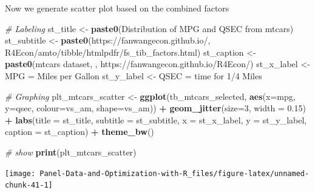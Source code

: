 \documentclass[
]{book}
\newenvironment{Shaded}{\begin{snugshade}}{\end{snugshade}}
\newcommand{\CommentTok}[1]{\textcolor[rgb]{0.56,0.35,0.01}{\textit{#1}}}
\newcommand{\DataTypeTok}[1]{\textcolor[rgb]{0.13,0.29,0.53}{#1}}
\newcommand{\DecValTok}[1]{\textcolor[rgb]{0.00,0.00,0.81}{#1}}
\newcommand{\FloatTok}[1]{\textcolor[rgb]{0.00,0.00,0.81}{#1}}
\newcommand{\KeywordTok}[1]{\textcolor[rgb]{0.13,0.29,0.53}{\textbf{#1}}}
\newcommand{\NormalTok}[1]{#1}
\newcommand{\OperatorTok}[1]{\textcolor[rgb]{0.81,0.36,0.00}{\textbf{#1}}}
\newcommand{\StringTok}[1]{\textcolor[rgb]{0.31,0.60,0.02}{#1}}
\begin{document}
Now we generate scatter plot based on the combined factors

\begin{Shaded}
\begin{Highlighting}[]
\CommentTok{\# Labeling}
\NormalTok{st\_title \textless{}{-}}\StringTok{ }\KeywordTok{paste0}\NormalTok{(}\StringTok{\textquotesingle{}Distribution of MPG and QSEC from mtcars\textquotesingle{}}\NormalTok{)}
\NormalTok{st\_subtitle \textless{}{-}}\StringTok{ }\KeywordTok{paste0}\NormalTok{(}\StringTok{\textquotesingle{}https://fanwangecon.github.io/\textquotesingle{}}\NormalTok{,}
                      \StringTok{\textquotesingle{}R4Econ/amto/tibble/htmlpdfr/fs\_tib\_factors.html\textquotesingle{}}\NormalTok{)}
\NormalTok{st\_caption \textless{}{-}}\StringTok{ }\KeywordTok{paste0}\NormalTok{(}\StringTok{\textquotesingle{}mtcars dataset, \textquotesingle{}}\NormalTok{,}
                     \StringTok{\textquotesingle{}https://fanwangecon.github.io/R4Econ/\textquotesingle{}}\NormalTok{)}
\NormalTok{st\_x\_label \textless{}{-}}\StringTok{ \textquotesingle{}MPG = Miles per Gallon\textquotesingle{}}
\NormalTok{st\_y\_label \textless{}{-}}\StringTok{ \textquotesingle{}QSEC = time for 1/4 Miles\textquotesingle{}}

\CommentTok{\# Graphing}
\NormalTok{plt\_mtcars\_scatter \textless{}{-}}\StringTok{ }
\StringTok{  }\KeywordTok{ggplot}\NormalTok{(tb\_mtcars\_selected, }
         \KeywordTok{aes}\NormalTok{(}\DataTypeTok{x=}\NormalTok{mpg, }\DataTypeTok{y=}\NormalTok{qsec, }\DataTypeTok{colour=}\NormalTok{vs\_am, }\DataTypeTok{shape=}\NormalTok{vs\_am)) }\OperatorTok{+}
\StringTok{  }\KeywordTok{geom\_jitter}\NormalTok{(}\DataTypeTok{size=}\DecValTok{3}\NormalTok{, }\DataTypeTok{width =} \FloatTok{0.15}\NormalTok{) }\OperatorTok{+}
\StringTok{  }\KeywordTok{labs}\NormalTok{(}\DataTypeTok{title =}\NormalTok{ st\_title, }\DataTypeTok{subtitle =}\NormalTok{ st\_subtitle,}
       \DataTypeTok{x =}\NormalTok{ st\_x\_label, }\DataTypeTok{y =}\NormalTok{ st\_y\_label, }\DataTypeTok{caption =}\NormalTok{ st\_caption) }\OperatorTok{+}
\StringTok{  }\KeywordTok{theme\_bw}\NormalTok{()}

\CommentTok{\# show}
\KeywordTok{print}\NormalTok{(plt\_mtcars\_scatter)}
\end{Highlighting}
\end{Shaded}

\begin{center}\texttt{[image: Panel-Data-and-Optimization-with-R\_files/figure-latex/unnamed-chunk-41-1]} \end{center}
\end{document}
